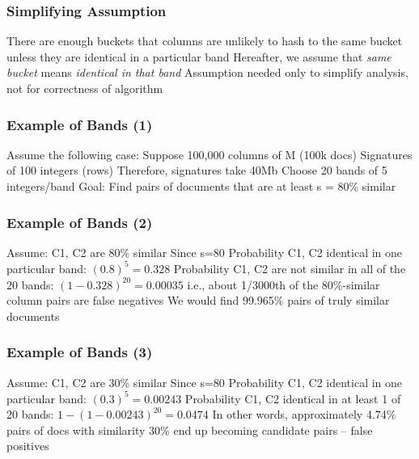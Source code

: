 \documentclass[svgnames]{beamer}
\begin{document}
  
\begin{frame} \frametitle{Simplifying Assumption}

There are enough buckets that columns are unlikely to hash to the same bucket unless they are identical in a particular band
Hereafter, we assume that \emph{same bucket} means \emph{identical in that band}
Assumption needed only to simplify analysis, not for correctness of algorithm

\end{frame}

  
\begin{frame} \frametitle{Example of Bands (1)}

Assume the following case:
  Suppose 100,000 columns of M (100k docs)
  Signatures of 100 integers (rows)
  Therefore, signatures take 40Mb
  Choose 20 bands of 5 integers/band
Goal: Find pairs of documents that are at least s = 80\% similar

\end{frame}

  
\begin{frame} \frametitle{Example of Bands (2)}

Assume: C1, C2 are 80\% similar
Since s=80%
Probability C1, C2 identical in one particular band: $(0.8)^5 = 0.328$
Probability C1, C2 are not similar in all of the 20 bands: $(1-0.328)^{20} = 0.00035$
  i.e., about 1/3000th of the 80\%-similar column pairs are false negatives
  We would find 99.965\% pairs of truly similar documents
  
\end{frame}

  
\begin{frame} \frametitle{Example of Bands (3)}

Assume: C1, C2 are 30\% similar
Since s=80%
Probability C1, C2 identical in one particular band: $(0.3)^5 = 0.00243$
Probability C1, C2 identical in at least 1 of 20 bands: $1 - (1 - 0.00243)^{20} = 0.0474$
  In other words, approximately 4.74\% pairs of docs with similarity 30\% end up becoming candidate pairs -- false positives
  
\end{frame}
\end{document}
